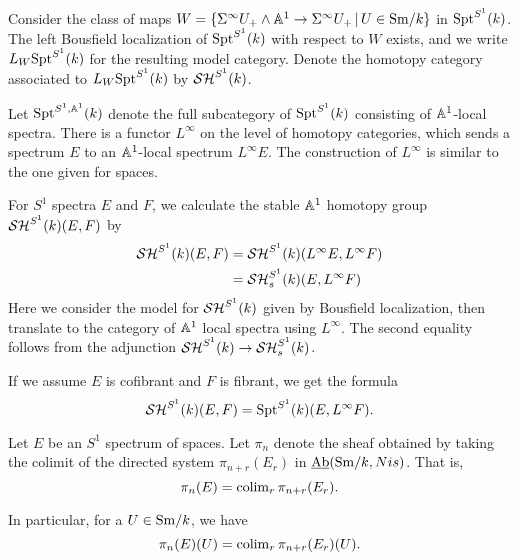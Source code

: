 \documentclass{amsart}%
\begin{document}
\begin{definition}
  Consider the class of maps
  $ W = \{\Sigma^{\infty} U_+ \wedge \mathbb{A}^1 \to \Sigma^{\infty}U_+ \, \vert \,
  U \in \mathrm{Sm}/k\}$
  in $\mathrm{Spt}^{S^1}(k)$. The left Bousfield localization of
  $\mathrm{Spt}^{S^1}(k)$ with respect to $W$ exists, and we write
  $L_W\mathrm{Spt}^{S^1}(k)$ for the resulting model category. Denote the
  homotopy category associated to $L_W\mathrm{Spt}^{S^1}(k)$ by
  $\mathcal{SH}^{S^1}(k)$.
\end{definition}

\begin{remark}
  Let $\mathrm{Spt}^{S^1,\mathbb{A}^1}(k)$ denote the full subcategory of
  $\mathrm{Spt}^{S^1}(k)$ consisting of $\mathbb{A}^1$-local spectra.  There is a
  functor $L^{\infty}$ on the level of homotopy categories, which
  sends a spectrum $E$ to an $\mathbb{A}^1$-local spectrum
  $L^{\infty}E$. The construction of $L^{\infty}$ is similar to the
  one given for spaces. 


  For $S^1$ spectra $E$ and $F$, we calculate the stable $\mathbb{A}^1$
  homotopy group$\mathcal{SH}^{S^1}(k)(E,F)$ by
  \begin{align*}
    \mathcal{SH}^{S^1}(k)(E,F) & = \mathcal{SH}^{S^1}(k)(L^{\infty} E, L^{\infty} F)\\
                      &= \mathcal{SH}^{S^1}_s(k)(E,L^{\infty}F)
  \end{align*}
  Here we consider the model for $\mathcal{SH}^{S^1}(k)$ given by Bousfield
  localization, then translate to the category of $\mathbb{A}^1$ local
  spectra using $L^{\infty}$. The second equality follows from the
  adjunction $\mathcal{SH}^{S^1}(k) \to \mathcal{SH}_s^{S^1}(k)$.

  If we assume $E$ is cofibrant and $F$ is fibrant, we get the formula
  \begin{equation*}
    \mathcal{SH}^{S^1}(k)(E,F) = \mathrm{Spt}^{S^1}(k)(E,L^{\infty}F).
  \end{equation*}
\end{remark}

\begin{definition}
  Let $E$ be an $S^1$ spectrum of spaces. Let $\pi_n$ denote the sheaf
  obtained by taking the colimit of the directed system
  $\pi_{n+r}(E_r)$ in $\operatorname{\underline{Ab}}(\mathrm{Sm}/k,Nis)$. That is,
  \begin{equation*}
    \pi_n(E) = \operatorname{colim}_{r} \pi_{n+r}(E_r). 
  \end{equation*}

  In particular, for a $U \in \mathrm{Sm}/k$, we have 
  \begin{equation*}
    \pi_n(E)(U) = \operatorname{colim}_{r} \pi_{n+r}(E_r)(U).
  \end{equation*}
\end{definition}
\end{document}

